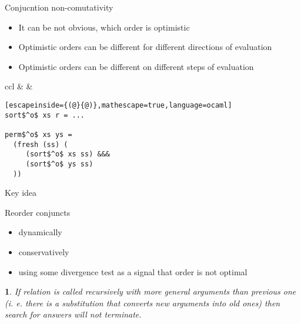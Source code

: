 \documentclass{beamer}
\theoremstyle{definition}
\theoremstyle{plain} %
\newcommand{\thistheoremname}{}
\newtheorem{genericthm}[thm]{\thistheoremname}
\newenvironment{namedthm}[1]
  {\renewcommand{\thistheoremname}{#1}%
   \begin{genericthm}}
  {\end{genericthm}}
\begin{document}
\begin{frame}[fragile]{Conjucntion non-comutativity}

 \begin{itemize}
 \item It can be not obvious, which order is optimistic
 
  \vskip5mm
  
 \item Optimistic orders can be different for different directions of evaluation
 
  \vskip5mm
  
 \item Optimistic orders can be different on different steps of evaluation
 \end{itemize}

\begin{tabular}{ccl}
& & \begin{lstlisting}[escapeinside={(@}{@)},mathescape=true,language=ocaml]
sort$^o$ xs r = ...

perm$^o$ xs ys =
  (fresh (ss) (
     (sort$^o$ xs ss) &&&
     (sort$^o$ ys ss)
  ))
 \end{lstlisting}
\end{tabular}

\end{frame}

\begin{frame}{Key idea}

Reorder conjuncts
 \begin{itemize}
 \item dynamically
  
 \item conservatively
 
 \item using some divergence test as a signal that order is not optimal
 \end{itemize}
 
 \vskip1cm
 
 \begin{namedthm}{Divergence test}
If relation is called recursively with more general arguments than previous one (i. e. there is a substitution that converts new arguments into old ones) then search for answers will not terminate.
\end{namedthm}

\end{frame}
\end{document}
